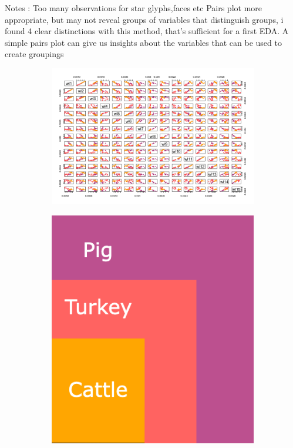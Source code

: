 \documentclass[openany]{article}
\begin{document}
	Notes : Too many observations for star glyphs,faces etc
	Pairs plot more appropriate, but may not reveal groups of variables that distinguish groups, i found 4 clear distinctions 
	with this method, that's sufficient for a first EDA.
	A simple pairs plot can give us insights about the variables that can be used to create groupings
	\begin{figure}[H]
		\begin{subfigure}{\textwidth}
			\centering
			\includegraphics[scale=0.5]{res/Spectroscopy-pairs}
		\end{subfigure}
		
		\begin{subfigure}{\textwidth}
			\centering
			\includegraphics[scale=0.1]{res/Color-Map}
		\end{subfigure}
	\end{figure}
\end{document}
